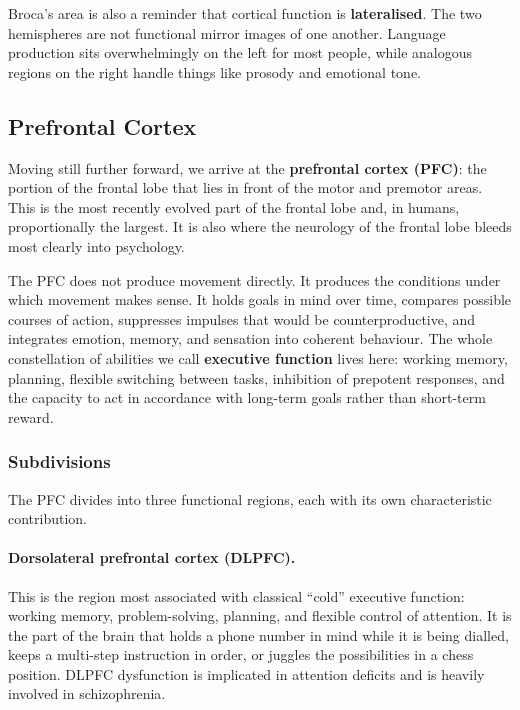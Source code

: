 \documentclass[11pt]{article}
\begin{document}
Broca's area is also a reminder that cortical function is \textbf{lateralised}. The two hemispheres are not functional mirror images of one another. Language production sits overwhelmingly on the left for most people, while analogous regions on the right handle things like prosody and emotional tone.

\subsection{Prefrontal Cortex}

Moving still further forward, we arrive at the \textbf{prefrontal cortex (PFC)}: the portion of the frontal lobe that lies in front of the motor and premotor areas. This is the most recently evolved part of the frontal lobe and, in humans, proportionally the largest. It is also where the neurology of the frontal lobe bleeds most clearly into psychology.

The PFC does not produce movement directly. It produces the conditions under which movement makes sense. It holds goals in mind over time, compares possible courses of action, suppresses impulses that would be counterproductive, and integrates emotion, memory, and sensation into coherent behaviour. The whole constellation of abilities we call \textbf{executive function} lives here: working memory, planning, flexible switching between tasks, inhibition of prepotent responses, and the capacity to act in accordance with long-term goals rather than short-term reward.

\subsubsection{Subdivisions}

The PFC divides into three functional regions, each with its own characteristic contribution.

\paragraph{Dorsolateral prefrontal cortex (DLPFC).} This is the region most associated with classical ``cold'' executive function: working memory, problem-solving, planning, and flexible control of attention. It is the part of the brain that holds a phone number in mind while it is being dialled, keeps a multi-step instruction in order, or juggles the possibilities in a chess position. DLPFC dysfunction is implicated in attention deficits and is heavily involved in schizophrenia.
\end{document}
